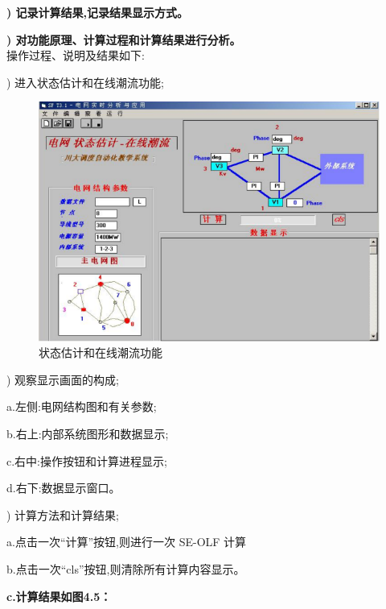 \documentclass[a4paper]{ctexrep}
\begin{document}
                    \textbf{) 记录计算结果,记录结果显示方式。}

                    \textbf{) 对功能原理、计算过程和计算结果进行分析。} \\

                    操作过程、说明及结果如下:

                    ) 进入状态估计和在线潮流功能;

                    \begin{figure}[htbp]
                        \centering
                        \includegraphics[width=12cm]{4.pdf}
                        \caption{状态估计和在线潮流功能}
                    \end{figure}

                    ) 观察显示画面的构成;

                    \qquad a.左侧:电网结构图和有关参数;

                    \qquad b.右上:内部系统图形和数据显示;

                    \qquad c.右中:操作按钮和计算进程显示;

                    \qquad d.右下:数据显示窗口。

                    ) 计算方法和计算结果;

                    \qquad a.点击一次“计算”按钮,则进行一次 SE-OLF 计算

                    \qquad b.点击一次“cls”按钮,则清除所有计算内容显示。

                    \qquad \textbf{c.计算结果如图4.5：}
\end{document}
